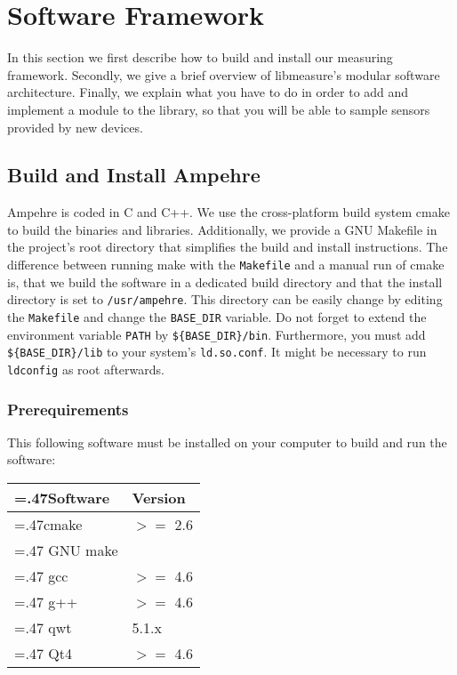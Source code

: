 %
%
%
%
%
%

\section{Software Framework}\label{sec:SoftwareArchitecture}

In this section we first describe how to build and install our measuring framework. Secondly, we give a brief overview of libmeasure's modular software architecture. Finally, we explain what you have to do in order to add and implement a module to the library, so that you will be able to sample sensors provided by new devices.

\subsection{Build and Install Ampehre}
Ampehre is coded in C and C++. We use the cross-platform build system cmake to build the binaries and libraries. Additionally, we provide a GNU Makefile in the project's root directory that simplifies the build and install instructions. The difference between running make with the \texttt{Makefile} and a manual run of cmake is, that we build the software in a dedicated build directory and that the install directory is set to \texttt{/usr/ampehre}. This directory can be easily change by editing the \texttt{Makefile} and change the \texttt{BASE\_DIR} variable. Do not forget to extend the environment variable \texttt{PATH} by \texttt{\$\{BASE\_DIR\}/bin}. Furthermore, you must add \texttt{\$\{BASE\_DIR\}/lib} to your system's \texttt{ld.so.conf}. It might be necessary to run \texttt{ldconfig} as root afterwards.

\subsubsection{Prerequirements}
This following software must be installed on your computer to build and run the software:

\begin{center}
\begin{tabularx}{.8\textwidth}{|>{\hsize=.47\textwidth}X|X|}
\hline
\textbf{Software} & \textbf{Version} \\ \hline
cmake & $>=$ 2.6\\ \hline
GNU make & \\ \hline
gcc & $>=$ 4.6\\ \hline
g++ & $>=$ 4.6\\ \hline
qwt & 5.1.x\\ \hline
Qt4 & $>=$ 4.6\\ \hline
\end{tabularx}
\end{center}

